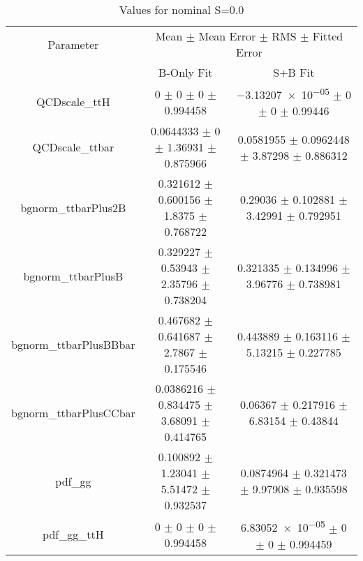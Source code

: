 \begin{table}
\centering
\caption{Values for nominal S=0.0}
\begin{tabular}{ccc}
\toprule
Parameter & \multicolumn{2}{c}{Mean $\pm$ Mean Error $\pm$ RMS $\pm$ Fitted Error}\\
 & B-Only Fit & S+B Fit\\
\midrule
QCDscale\_ttH & \num{0} $\pm$ \num{0} $\pm$ \num{0} $\pm$ \num{0.994458} & \num{-3.13207e-05} $\pm$ \num{0} $\pm$ \num{0} $\pm$ \num{0.99446}\\
QCDscale\_ttbar & \num{0.0644333} $\pm$ \num{0} $\pm$ \num{1.36931} $\pm$ \num{0.875966} & \num{0.0581955} $\pm$ \num{0.0962448} $\pm$ \num{3.87298} $\pm$ \num{0.886312}\\
bgnorm\_ttbarPlus2B & \num{0.321612} $\pm$ \num{0.600156} $\pm$ \num{1.8375} $\pm$ \num{0.768722} & \num{0.29036} $\pm$ \num{0.102881} $\pm$ \num{3.42991} $\pm$ \num{0.792951}\\
bgnorm\_ttbarPlusB & \num{0.329227} $\pm$ \num{0.53943} $\pm$ \num{2.35796} $\pm$ \num{0.738204} & \num{0.321335} $\pm$ \num{0.134996} $\pm$ \num{3.96776} $\pm$ \num{0.738981}\\
bgnorm\_ttbarPlusBBbar & \num{0.467682} $\pm$ \num{0.641687} $\pm$ \num{2.7867} $\pm$ \num{0.175546} & \num{0.443889} $\pm$ \num{0.163116} $\pm$ \num{5.13215} $\pm$ \num{0.227785}\\
bgnorm\_ttbarPlusCCbar & \num{0.0386216} $\pm$ \num{0.834475} $\pm$ \num{3.68091} $\pm$ \num{0.414765} & \num{0.06367} $\pm$ \num{0.217916} $\pm$ \num{6.83154} $\pm$ \num{0.43844}\\
pdf\_gg & \num{0.100892} $\pm$ \num{1.23041} $\pm$ \num{5.51472} $\pm$ \num{0.932537} & \num{0.0874964} $\pm$ \num{0.321473} $\pm$ \num{9.97908} $\pm$ \num{0.935598}\\
pdf\_gg\_ttH & \num{0} $\pm$ \num{0} $\pm$ \num{0} $\pm$ \num{0.994458} & \num{6.83052e-05} $\pm$ \num{0} $\pm$ \num{0} $\pm$ \num{0.994459}\\
\bottomrule
\end{tabular}
\end{table}